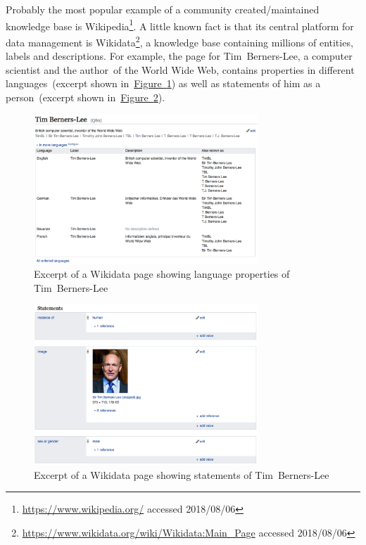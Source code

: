 Probably the most popular example of a community created/maintained knowledge base is Wikipedia\footnote{\url{https://www.wikipedia.org/} accessed 2018/08/06}. A little known fact is that its central platform for data management is Wikidata\footnote{\url{https://www.wikidata.org/wiki/Wikidata:Main_Page} accessed 2018/08/06}, a knowledge base containing millions of entities, labels and descriptions. For example, the page for Tim~Berners-Lee, a computer scientist and the \guillemotright author\guillemotleft~of the World Wide Web, contains properties in different languages~(excerpt shown in~\hyperref[fig:wikidata_tim_berners_lee_lang]{Figure~\ref*{fig:wikidata_tim_berners_lee_lang}}) as well as statements of him as a person~(excerpt shown in~\hyperref[fig:wikidata_tim_berners_lee_stat]{Figure~\ref*{fig:wikidata_tim_berners_lee_stat}}). 
\begin{figure}
	 \centering
	 \includegraphics[width=0.75\textwidth]{graphics/wikidata_tim_berners_lee_lang}
	 \caption{Excerpt of a Wikidata page showing language properties of Tim~Berners-Lee}\label{fig:wikidata_tim_berners_lee_lang}
\end{figure}
\begin{figure}
	 \centering
	 \includegraphics[width=0.75\textwidth]{graphics/wikidata_tim_berners_lee_stat}
	 \caption{Excerpt of a Wikidata page showing statements of Tim~Berners-Lee}\label{fig:wikidata_tim_berners_lee_stat}
\end{figure}
